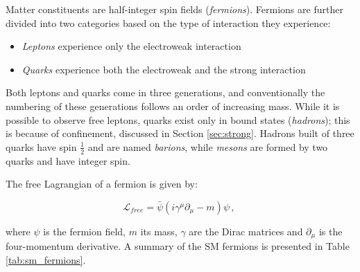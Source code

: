 Matter constituents are half-integer spin fields (\textit{fermions}). Fermions are further divided into two categories based on the type of interaction they experience:
\begin{itemize}
\item \textit{Leptons} experience only the electroweak interaction
\item \textit{Quarks} experience both the electroweak and the strong interaction
\end{itemize}

Both leptons and quarks come in three generations, and conventionally the numbering of these generations follows an order of increasing mass. While it is possible to observe free leptons, quarks exist only in bound states (\textit{hadrons}); this is because of confinement, discussed in Section \ref{sec:strong}. Hadrons built of three quarks have spin $\frac{1}{2}$ and are named \textit{barions}, while \textit{mesons} are formed by two quarks and have integer spin.


The free Lagrangian of a fermion is given by:

\begin{equation}
 \mathcal{L}_{free} = \bar{\psi} \left( i \gamma^{\mu} \partial_{\mu} - m \right) \psi \, , \
 \label{eq:sm:dirac}
\end{equation}

\noindent where $\psi$ is the fermion field, $m$ its mass, $\gamma$ are the Dirac matrices and $\partial_{\mu}$ is the four-momentum derivative. A summary of the SM fermions is presented in Table \ref{tab:sm_fermions}.

